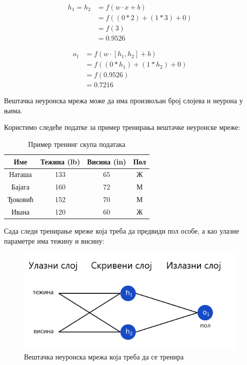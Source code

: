 \documentclass[12pt, а4paper]{article}
\begin{document}
\begin{equation}
\begin{split}
h_1 = h_2 & = f(w \cdot x + b) \\
& = f((0 * 2) + (1 * 3) + 0) \\
& = f(3) \\
& = 0.9526
\end{split}
\end{equation}

\begin{equation}
\begin{split}
o_1 & = f(w \cdot [h_1, h_2] + b) \\
& = f((0 * h_1) + (1 * h_2) + 0) \\
& = f(0.9526) \\
& = 0.7216
\end{split}
\end{equation}

Вештачка неуронска мрежа може да има произвољан број слојева и неурона у њима.

Користимо следеће податке за пример тренирања вештачке неуронске мреже:
\begin{table}[H]
\centering
 \begin{tabular}{| c | c | c | c |}
  \hline
  Име & Тежина (lb) & Висина (in) & Пол \\
  \hline
  Наташа & 133 & 65 & Ж\\
  Бајага & 160 & 72 & М\\
  Ђоковић & 152 & 70 & М\\
  Ивана & 120 & 60 & Ж\\
  \hline
 \end{tabular}
 \caption{Пример тренинг скупа података}
\end{table}

Сада следи тренирање мреже која треба да предвиди пол особе, а као
улазне параметре има тежину и висину:

\begin{figure}[H]
  \centering
      \includegraphics[scale=0.6]{slike/neuronskaMrezaTren.png}
  \caption{Вештачка неуронска мрежа која треба да се тренира}
  \label{fig:nn_osnovaTren}
\end{figure}
\end{document}

